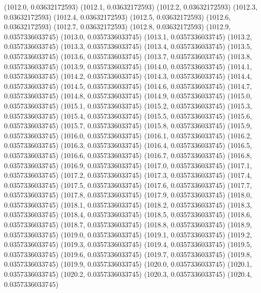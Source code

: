 {					(1012.0, 0.03632172593)
					(1012.1, 0.03632172593)
					(1012.2, 0.03632172593)
					(1012.3, 0.03632172593)
					(1012.4, 0.03632172593)
					(1012.5, 0.03632172593)
					(1012.6, 0.03632172593)
					(1012.7, 0.03632172593)
					(1012.8, 0.03632172593)
					(1012.9, 0.0357336033745)
					(1013.0, 0.0357336033745)
					(1013.1, 0.0357336033745)
					(1013.2, 0.0357336033745)
					(1013.3, 0.0357336033745)
					(1013.4, 0.0357336033745)
					(1013.5, 0.0357336033745)
					(1013.6, 0.0357336033745)
					(1013.7, 0.0357336033745)
					(1013.8, 0.0357336033745)
					(1013.9, 0.0357336033745)
					(1014.0, 0.0357336033745)
					(1014.1, 0.0357336033745)
					(1014.2, 0.0357336033745)
					(1014.3, 0.0357336033745)
					(1014.4, 0.0357336033745)
					(1014.5, 0.0357336033745)
					(1014.6, 0.0357336033745)
					(1014.7, 0.0357336033745)
					(1014.8, 0.0357336033745)
					(1014.9, 0.0357336033745)
					(1015.0, 0.0357336033745)
					(1015.1, 0.0357336033745)
					(1015.2, 0.0357336033745)
					(1015.3, 0.0357336033745)
					(1015.4, 0.0357336033745)
					(1015.5, 0.0357336033745)
					(1015.6, 0.0357336033745)
					(1015.7, 0.0357336033745)
					(1015.8, 0.0357336033745)
					(1015.9, 0.0357336033745)
					(1016.0, 0.0357336033745)
					(1016.1, 0.0357336033745)
					(1016.2, 0.0357336033745)
					(1016.3, 0.0357336033745)
					(1016.4, 0.0357336033745)
					(1016.5, 0.0357336033745)
					(1016.6, 0.0357336033745)
					(1016.7, 0.0357336033745)
					(1016.8, 0.0357336033745)
					(1016.9, 0.0357336033745)
					(1017.0, 0.0357336033745)
					(1017.1, 0.0357336033745)
					(1017.2, 0.0357336033745)
					(1017.3, 0.0357336033745)
					(1017.4, 0.0357336033745)
					(1017.5, 0.0357336033745)
					(1017.6, 0.0357336033745)
					(1017.7, 0.0357336033745)
					(1017.8, 0.0357336033745)
					(1017.9, 0.0357336033745)
					(1018.0, 0.0357336033745)
					(1018.1, 0.0357336033745)
					(1018.2, 0.0357336033745)
					(1018.3, 0.0357336033745)
					(1018.4, 0.0357336033745)
					(1018.5, 0.0357336033745)
					(1018.6, 0.0357336033745)
					(1018.7, 0.0357336033745)
					(1018.8, 0.0357336033745)
					(1018.9, 0.0357336033745)
					(1019.0, 0.0357336033745)
					(1019.1, 0.0357336033745)
					(1019.2, 0.0357336033745)
					(1019.3, 0.0357336033745)
					(1019.4, 0.0357336033745)
					(1019.5, 0.0357336033745)
					(1019.6, 0.0357336033745)
					(1019.7, 0.0357336033745)
					(1019.8, 0.0357336033745)
					(1019.9, 0.0357336033745)
					(1020.0, 0.0357336033745)
					(1020.1, 0.0357336033745)
					(1020.2, 0.0357336033745)
					(1020.3, 0.0357336033745)
					(1020.4, 0.0357336033745)
}
